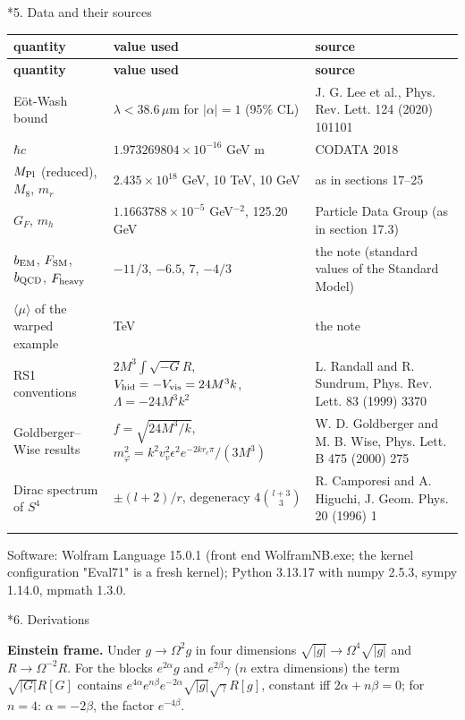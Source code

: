 \documentclass[10pt,a4paper]{article}
\makeatletter
\renewcommand\section{\@startsection{section}{1}{\z@}{-3.5ex \@plus -1ex \@minus -.2ex}{2.3ex \@plus.2ex}{\normalfont\Large\bfseries\raggedright}}
\makeatother
\begin{document}
\section*{5. Data and their sources}
{\footnotesize
\begin{longtable}{>{\raggedright\arraybackslash}p{}>{\raggedright\arraybackslash}p{}>{\raggedright\arraybackslash}p{}}
\toprule
\textbf{quantity} & \textbf{value used} & \textbf{source} \\
\midrule\endfirsthead
\toprule
\textbf{quantity} & \textbf{value used} & \textbf{source} \\
\midrule\endhead
\endfoot
\bottomrule\endlastfoot
Eöt-Wash bound & $\lambda<38.6\,\mu$m for $|\alpha|=1$ (95\% CL) & J. G. Lee et al., Phys. Rev. Lett. 124 (2020) 101101 \\
$\hbar c$ & $1.973269804\times10^{-16}$ GeV m & CODATA 2018 \\
$M_{\rm Pl}$ (reduced), $M_8$, $m_r$ & $2.435\times10^{18}$ GeV, 10 TeV, 10 GeV & as in sections 17–25 \\
$G_F$, $m_h$ & $1.1663788\times10^{-5}$ GeV$^{-2}$, 125.20 GeV & Particle Data Group (as in section 17.3) \\
$b_{\rm EM}$, $F_{\rm SM}$, $b_{\rm QCD}$, $F_{\rm heavy}$ & $-11/3$, $-6.5$, $7$, $-4/3$ & the note (standard values of the Standard Model) \\
$\langle\mu\rangle$ of the warped example & 3 TeV & the note \\
RS1 conventions & $2M^3\int\sqrt{-G}R$, $V_{\rm hid}=-V_{\rm vis}=24M^3k$, $\Lambda=-24M^3k^2$ & L. Randall and R. Sundrum, Phys. Rev. Lett. 83 (1999) 3370 \\
Goldberger–Wise results & $f=\sqrt{24M^3/k}$, $m_\varphi^2=k^2v_v^2\epsilon^2e^{-2kr_c\pi}/(3M^3)$ & W. D. Goldberger and M. B. Wise, Phys. Lett. B 475 (2000) 275 \\
Dirac spectrum of $S^4$ & $\pm(l+2)/r$, degeneracy $4\binom{l+3}3$ & R. Camporesi and A. Higuchi, J. Geom. Phys. 20 (1996) 1 \\*
\end{longtable}}
Software: Wolfram Language 15.0.1 (front end WolframNB.exe; the kernel configuration "Eval71" is a fresh kernel); Python 3.13.17 with numpy 2.5.3, sympy 1.14.0, mpmath 1.3.0.

\section*{6. Derivations}
\textbf{Einstein frame.} Under $g\to\Omega^2g$ in four dimensions $\sqrt{|g|}\to\Omega^4\sqrt{|g|}$ and $R\to\Omega^{-2}R$. For the blocks $e^{2\alpha}g$ and $e^{2\beta}\gamma$ ($n$ extra dimensions) the term $\sqrt{|G|}R[G]$ contains $e^{4\alpha}e^{n\beta}e^{-2\alpha}\sqrt{|g|}\sqrt\gamma R[g]$, constant iff $2\alpha+n\beta=0$; for $n=4$: $\alpha=-2\beta$, the factor $e^{-4\beta}$.
\end{document}
